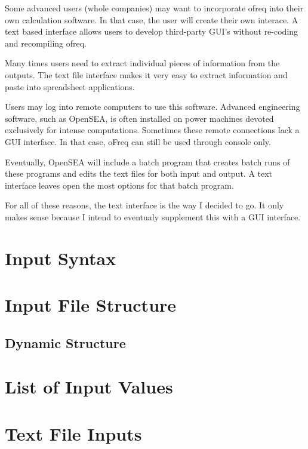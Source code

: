 \begin{DoxyEnumerate}
\item Some advanced users (whole companies) may want to incorporate ofreq into their own calculation software. In that case, the user will create their own interace. A text based interface allows users to develop third-\/party G\-U\-I's without re-\/coding and recompiling ofreq.
\item Many times users need to extract individual pieces of information from the outputs. The text file interface makes it very easy to extract information and paste into spreadsheet applications.
\item Users may log into remote computers to use this software. Advanced engineering software, such as Open\-S\-E\-A, is often installed on power machines devoted exclusively for intense computations. Sometimes these remote connections lack a G\-U\-I interface. In that case, o\-Freq can still be used through console only.
\item Eventually, Open\-S\-E\-A will include a batch program that creates batch runs of these programs and edits the text files for both input and output. A text interface leaves open the most options for that batch program.
\end{DoxyEnumerate}

For all of these reasons, the text interface is the way I decided to go. It only makes sense because I intend to eventualy supplement this with a G\-U\-I interface. \hypertarget{InputSyntax}{}\section{Input Syntax}\label{InputSyntax}
\section*{Input File Structure}

\subsection*{Dynamic Structure}\hypertarget{InputValues}{}\section{List of Input Values}\label{InputValues}
\hypertarget{WhyTextFiles}{}\section{Text File Inputs}\label{WhyTextFiles}
